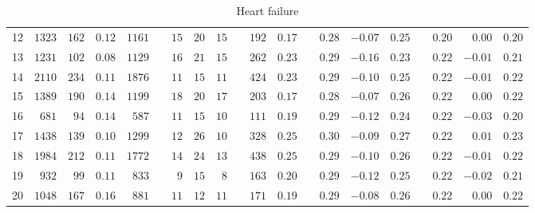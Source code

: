 \documentclass[]{article}\usepackage[]{graphicx}\usepackage[]{color}
\begin{document}
\begin{landscape}
\begin{table}[!tbp]
\begin{center}
\begin{tabular}{lrrrrcrrrcrrcrrrcrrr}
12&$1323$&$162$&$0.12$&$1161$&&$15$&$20$&$15$&&$192$&$0.17$&&$0.28$&$-0.07$&$0.25$&&$0.20$&$ 0.00$&$0.20$\tabularnewline
13&$1231$&$102$&$0.08$&$1129$&&$16$&$21$&$15$&&$262$&$0.23$&&$0.29$&$-0.16$&$0.23$&&$0.22$&$-0.01$&$0.21$\tabularnewline
14&$2110$&$234$&$0.11$&$1876$&&$11$&$15$&$11$&&$424$&$0.23$&&$0.29$&$-0.10$&$0.25$&&$0.22$&$-0.01$&$0.22$\tabularnewline
15&$1389$&$190$&$0.14$&$1199$&&$18$&$20$&$17$&&$203$&$0.17$&&$0.28$&$-0.07$&$0.26$&&$0.22$&$ 0.00$&$0.22$\tabularnewline
16&$ 681$&$ 94$&$0.14$&$ 587$&&$11$&$15$&$10$&&$111$&$0.19$&&$0.29$&$-0.12$&$0.24$&&$0.22$&$-0.03$&$0.20$\tabularnewline
17&$1438$&$139$&$0.10$&$1299$&&$12$&$26$&$10$&&$328$&$0.25$&&$0.30$&$-0.09$&$0.27$&&$0.22$&$ 0.01$&$0.23$\tabularnewline
18&$1984$&$212$&$0.11$&$1772$&&$14$&$24$&$13$&&$438$&$0.25$&&$0.29$&$-0.10$&$0.26$&&$0.22$&$-0.01$&$0.22$\tabularnewline
19&$ 932$&$ 99$&$0.11$&$ 833$&&$ 9$&$15$&$ 8$&&$163$&$0.20$&&$0.29$&$-0.12$&$0.25$&&$0.22$&$-0.02$&$0.21$\tabularnewline
20&$1048$&$167$&$0.16$&$ 881$&&$11$&$12$&$11$&&$171$&$0.19$&&$0.29$&$-0.08$&$0.26$&&$0.22$&$ 0.00$&$0.22$\tabularnewline
\hline
\end{tabular}

\caption{Heart failure\label{round}}\end{center}

\end{table}




\end{landscape}
\end{document}
